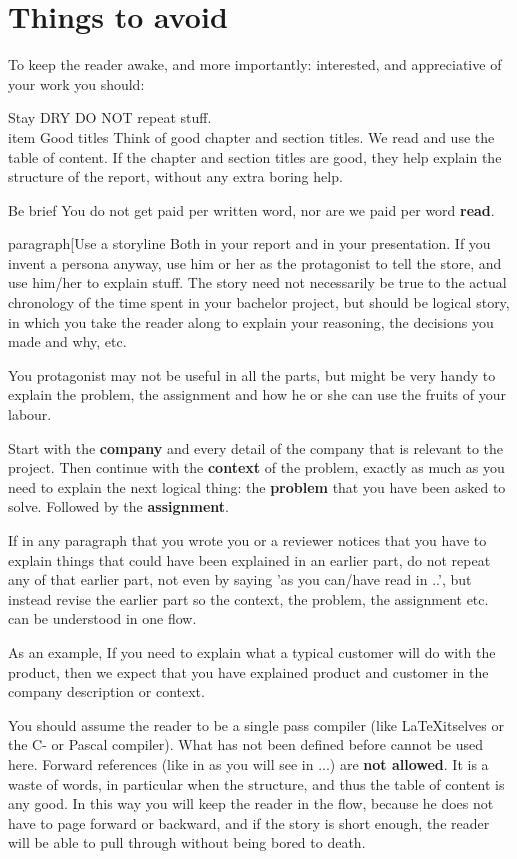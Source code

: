 \section{Things to avoid}
To keep the reader awake, and more importantly: interested, and appreciative of your work you should:
\begin{Description}
\item[Stay DRY]DO NOT repeat stuff.
\\item[Good titles] Think of good chapter and section titles. We read and use the table of content. If the chapter and section titles are good, they help explain the structure of the report, without any extra boring help.
\item[Be brief] You do not get paid per written word, nor are we paid per word \textbf{read}.
\item[paragraph[Use a storyline] Both in your report and in your presentation. If you invent a persona anyway, use him or her as the protagonist to tell the store, and use him/her to explain stuff.
The story need not necessarily be true to the actual chronology of the time spent in your bachelor project, but should be logical story, in which you take the reader along to explain your reasoning, the decisions you made and why, etc.
\end{Description}

You protagonist may not be useful in all the parts, but might be very handy to explain the problem, the assignment and how he or she can use the fruits of your labour.

Start with the \textbf{company} and every detail of the company that is relevant to the project.
Then continue with the \textbf{context} of the problem, exactly as much as you need to explain the next logical thing: the \textbf{problem} that you have been asked to solve. Followed by the \textbf{assignment}.

If in any paragraph that you wrote you or a reviewer notices that you have to explain things
that could have been explained in an earlier part, do not repeat any of that earlier part,
not even by saying 'as you can/have read in ..', but instead revise the earlier part so the context, the problem, the assignment etc. can be understood in one flow.

As an example, If you need to explain what a typical customer will do with the product, then we expect that you have explained product and customer in the company description or context.

You should assume the reader to be a single pass compiler (like \LaTeX itselves or the C- or Pascal compiler). What has not been defined before cannot be used here. Forward references (like in as you will see in ...) are \textbf{not allowed}. It is a waste of words, in particular when the structure, and thus the table of content is any good.
In this way you will keep the reader in the flow, because he does not have to page forward or backward, and if the story is short enough, the reader will be able to pull through without being bored to death.

